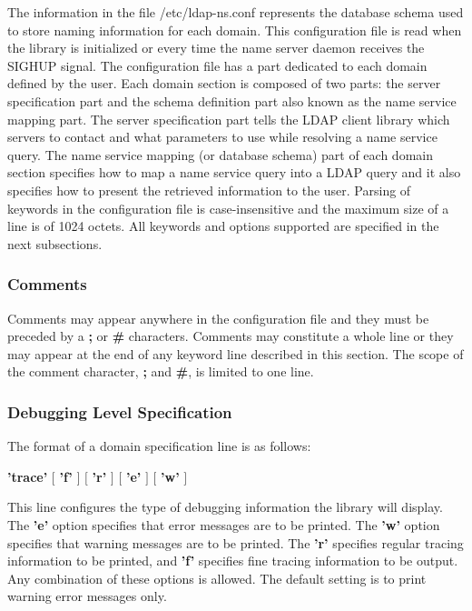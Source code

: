 The information in the file /etc/ldap-ns.conf represents the
database schema used to store naming information for each domain. This
configuration file is read when the library is initialized or every
time the name server daemon receives the SIGHUP signal.
The configuration file has a part dedicated to each domain defined
by the user. Each domain section is composed of two parts: the server
specification part and the schema definition part also known as the name
service mapping part. The server specification part tells the LDAP client
library which servers to contact and what parameters to use while
resolving a name service query. The name service mapping (or database
schema) part of each domain section specifies how to map a name service
query into a LDAP query and it also specifies how to present the
retrieved information to the user.
Parsing of keywords in the configuration file is case-insensitive and
the maximum size of a line is of 1024 octets.
All keywords and options supported are specified in the next subsections.

\subsubsection{Comments}

Comments may appear anywhere in the configuration file and they must
be preceded by a {\bf ;} or {\bf \#} characters. Comments may
constitute a whole line or they may appear at the end of any keyword line
described in this section. The scope of the comment character, {\bf ;}
and {\bf \#}, is limited to one line.

\subsubsection{Debugging Level Specification}

The format of a domain specification line is as follows:

\begin{center}
{\bf 'trace'} $[$ {\bf 'f'} $]$ $[$ {\bf 'r'} $]$ $[$ {\bf 'e'} $]$ $[$ {\bf 'w' } $]$
\end{center}

This line configures the type of debugging information the library
will display. The {\bf 'e'} option specifies that error messages
are to be printed. The {\bf 'w'} option specifies that warning
messages are to be printed. The {\bf 'r'} specifies regular 
tracing information to be printed, and {\bf 'f'} specifies fine
tracing information to be output. Any combination of these options is
allowed. The default setting is to print warning error messages only.


